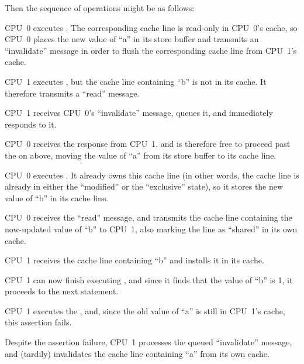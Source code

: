 Then the sequence of operations might be as follows:
\begin{fcvref}
\begin{sequence}
\item	CPU~0 executes .
	The corresponding cache line is read-only in CPU~0's cache, so
	CPU~0 places the new value of ``a'' in its store buffer and
	transmits an ``invalidate'' message in order to flush the
	corresponding cache line from CPU~1's cache.
	\label{seq:app:whymb:Invalidate Queues and Memory Barriers}
\item	CPU~1 executes , but the cache line
	containing ``b'' is not in its cache.
	It therefore transmits a ``read'' message.
\item	CPU~1 receives CPU~0's ``invalidate'' message, queues it, and
	immediately responds to it.
\item	CPU~0 receives the response from CPU~1, and is therefore free
	to proceed past the  on  above, moving
	the value of ``a'' from its store buffer to its cache line.
\item	CPU~0 executes .
	It already owns this cache line (in other words, the cache line
	is already in either the ``modified'' or the ``exclusive'' state),
	so it stores the new value of ``b'' in its cache line.
\item	CPU~0 receives the ``read'' message, and transmits the
	cache line containing the now-updated value of ``b''
	to CPU~1, also marking the line as ``shared'' in its own cache.
\item	CPU~1 receives the cache line containing ``b'' and installs
	it in its cache.
\item	CPU~1 can now finish executing ,
	and since it finds that the value of ``b'' is 1, it proceeds
	to the next statement.
\item	CPU~1 executes the , and, since the
	old value of ``a'' is still in CPU~1's cache,
	this assertion fails.
\item	Despite the assertion failure, CPU~1 processes the queued
	``invalidate'' message, and (tardily)
	invalidates the cache line containing ``a'' from its own cache.
\end{sequence}
\end{fcvref}

\QuickQuizEnd

